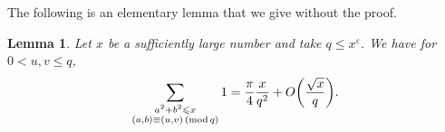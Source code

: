 \documentclass[12pt]{amsart}
\newtheorem{lem}[thm]{Lemma}
\theoremstyle{definition}
\theoremstyle{definition}
\theoremstyle{remark}
\numberwithin{equation}{section}
\renewcommand{\leq}{\leqslant}
\renewcommand{\mod}[1]{\,({\rm mod}\,#1)}
\begin{document}
The following is an elementary lemma that we give without the proof.
\begin{lem}\label{sum_of_squares_in_short_int_and_aps}
Let $x$ be a sufficiently large number and take $q\leq x^{\varepsilon}$. We have for $0 < u,v \leq q$,
$$ \sum_{\substack{a^2+b^2\leq x \\ (a,b)\equiv (u,v)\mod q}} 1 = \frac{\pi}{4} \frac{x}{q^2}+O\bigg( \frac{\sqrt{x}}{q} \bigg) .$$
\end{lem}
\end{document}
